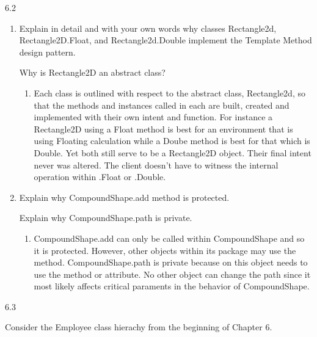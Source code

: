 
6.2 

\begin{enumerate}[label=(\alph*),align=left, wide, labelwidth=!, labelindent=0pt]
\item Explain in detail and with your own words why classes Rectangle2d, Rectangle2D.Float, and Rectangle2d.Double implement the Template Method design pattern.

Why is Rectangle2D an abstract class?

\begin{enumerate}[leftmargin = 1cm, rightmargin = 1cm]
\item[]  Each class is outlined with respect to the abstract class, Rectangle2d, so that the methods and instances called in each are built, created and implemented with their own intent and function.  For instance a Rectangle2D using a Float method is best for an environment that is using Floating calculation while a Doube method is best for that which is Double.  Yet both still serve to be a Rectangle2D object.  Their final intent never was altered.  The client doesn't have to witness the internal operation within .Float or .Double.
\end{enumerate}


\item Explain why CompoundShape.add method is protected. 

Explain why CompoundShape.path is private.

\begin{enumerate}[leftmargin = 1cm, rightmargin = 1cm]
\item[]  CompoundShape.add can only be called within CompoundShape and so it is protected.  However, other objects within its package may use the method.  CompoundShape.path is private because on this object needs to use the method or attribute.  No other object can change the path since it most likely affects critical paraments in the behavior of CompoundShape.
  		
\end{enumerate}


\end{enumerate}


6.3

Consider the Employee class hierachy from the beginning of Chapter 6.

